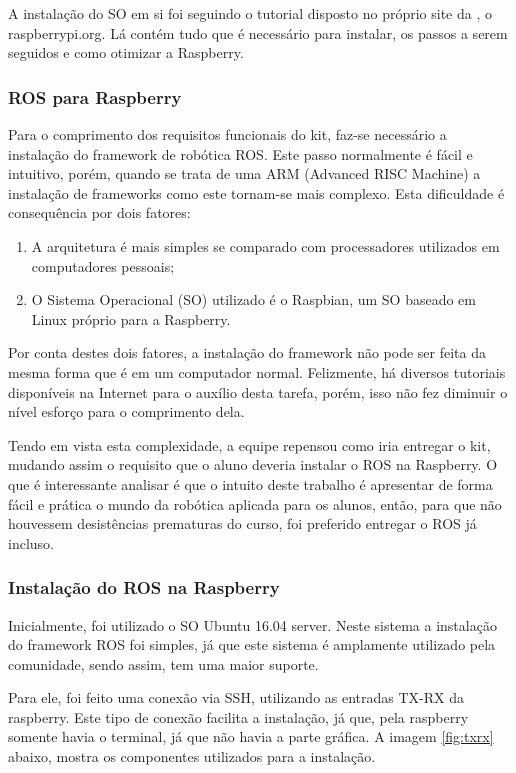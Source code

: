 A instalação do SO em si foi seguindo o tutorial disposto no próprio site da \cite{RASPB}, o raspberrypi.org. Lá contém tudo que é necessário para instalar, os passos a serem seguidos e como otimizar a Raspberry.
\subsubsection{ROS para Raspberry}
Para o comprimento dos requisitos funcionais do kit, faz-se necessário a instalação do framework de robótica ROS. Este passo normalmente é fácil e intuitivo, porém, quando se trata de uma ARM (Advanced RISC Machine) a instalação de frameworks como este tornam-se mais complexo. Esta dificuldade é consequência por dois fatores:

\begin{enumerate}
	\item A arquitetura é mais simples se comparado com processadores utilizados em computadores pessoais;
	\item O Sistema Operacional (SO) utilizado é o Raspbian, um SO baseado em Linux próprio para a Raspberry.
\end{enumerate}

Por conta destes dois fatores, a instalação do framework não pode ser feita da mesma forma que é em um computador normal. Felizmente, há diversos tutoriais disponíveis na Internet para o auxílio desta tarefa, porém, isso não fez diminuir o nível esforço para o comprimento dela.

Tendo em vista esta complexidade, a equipe repensou como iria entregar o kit, mudando assim o requisito que o aluno deveria instalar o ROS na Raspberry. O que é interessante analisar é que o intuito deste trabalho é apresentar de forma fácil e prática o mundo da robótica aplicada para os alunos, então, para que não houvessem desistências prematuras do curso, foi preferido entregar o ROS já incluso.
\subsubsection{Instalação do ROS na Raspberry}

Inicialmente, foi utilizado o SO Ubuntu 16.04 server. Neste sistema a instalação do framework ROS foi simples, já que este sistema é amplamente utilizado pela comunidade, sendo assim, tem uma maior suporte.

Para ele, foi feito uma conexão via SSH, utilizando as entradas TX-RX da raspberry. Este tipo de conexão facilita a instalação, já que, pela raspberry somente havia o terminal, já que não havia a parte gráfica. A imagem \ref{fig:txrx} abaixo, mostra os componentes utilizados para a instalação.

